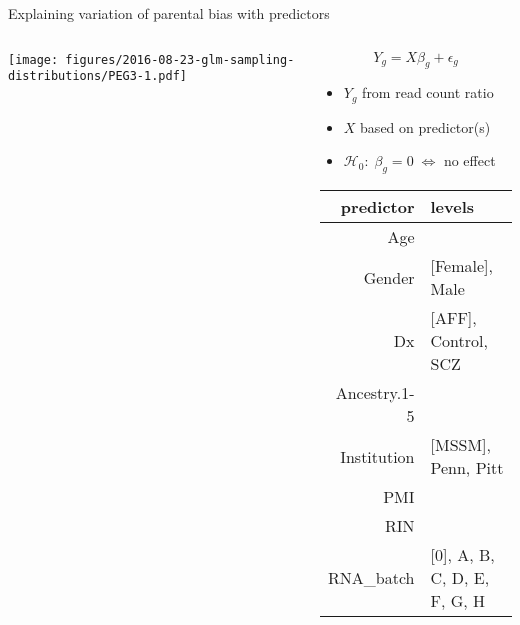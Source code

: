 \documentclass{beamer}
\newcommand{\platefigscale}[0]{0.7}
\begin{document}
\begin{frame}{Explaining variation of parental bias with predictors}
\begin{columns}
\begin{column}{0.60\textwidth}

\texttt{[image: figures/2016-08-23-glm-sampling-distributions/PEG3-1.pdf]}
\end{column}
\begin{column}{0.45\textwidth}
\begin{equation*}
Y_g = X \beta_g + \epsilon_g
\end{equation*}
\vfill
\footnotesize
\begin{itemize}
\item \(Y_g\) from read count ratio
\item \(X\) based on predictor(s)
\item \(\mathcal{H}_0:\; \beta_g = 0 \; \Leftrightarrow \) no effect
\end{itemize}
\tiny
\vfill
\begin{tabular}{|r|l|}
\hline
predictor & levels \\
\hline
Age & \\
Gender & [Female], Male\\
Dx & [AFF], Control, SCZ\\
Ancestry.1-5 & \\
Institution & [MSSM], Penn, Pitt\\
PMI & \\
RIN & \\
RNA\_batch & [0], A, B, C, D, E, F, G, H\\
\hline
\end{tabular}


\end{column}
\end{columns}
\end{frame}
\end{document}
